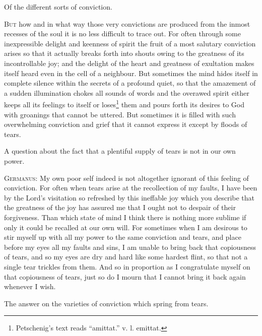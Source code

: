 
Of the different sorts of conviction.

\textsc{But} how and in what way those very convictions are produced from the inmost recesses of the soul it is no less difficult to trace out. For often through some inexpressible delight and keenness of spirit the fruit of a most salutary conviction arises so that it actually breaks forth into shouts owing to the greatness of its incontrollable joy; and the delight of the heart and greatness of exultation makes itself heard even in the cell of a neighbour. But sometimes the mind hides itself in complete silence within the secrets of a profound quiet, so that the amazement of a sudden illumination chokes all sounds of words and the overawed spirit either keeps all its feelings to itself or loses\footnote{Petschenig’s text reads “amittat.” v. l. emittat.} them and pours forth its desires to God with groanings that cannot be uttered. But sometimes it is filled with such overwhelming conviction and grief that it cannot express it except by floods of tears.


A question about the fact that a plentiful supply of tears is not in our own power.

\textsc{Germanus}: My own poor self indeed is not altogether ignorant of this feeling of conviction. For often when tears arise at the recollection of my faults, I have been by the Lord’s visitation so refreshed by this ineffable joy which you describe that the greatness of the joy has assured me that I ought not to despair of their forgiveness. Than which state of mind I think there is nothing more sublime if only it could be recalled at our own will. For sometimes when I am desirous to stir myself up with all my power to the same conviction and tears, and place before my eyes all my faults and sins, I am unable to bring back that copiousness of tears, and so my eyes are dry and hard like some hardest flint, so that not a single tear trickles from them. And so in proportion as I congratulate myself on that copiousness of tears, just so do I mourn that I cannot bring it back again whenever I wish.


The answer on the varieties of conviction which spring from tears.

